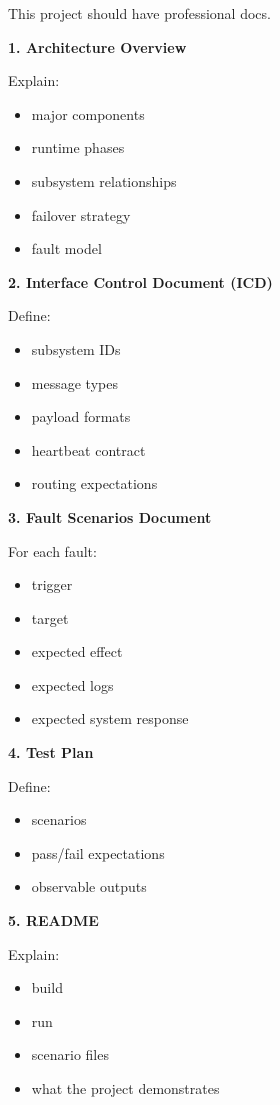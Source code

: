 \documentclass{report}
\begin{document}
This project should have professional docs.

\textbf{1. Architecture Overview}

Explain:
\begin{itemize}
   \item major components
   \item runtime phases
   \item subsystem relationships
   \item failover strategy
   \item fault model
\end{itemize}

\textbf{2. Interface Control Document (ICD)}

Define:
\begin{itemize}
   \item subsystem IDs
   \item message types
   \item payload formats
   \item heartbeat contract
   \item routing expectations
\end{itemize}

\textbf{3. Fault Scenarios Document}

For each fault:
\begin{itemize}
   \item trigger
   \item target
   \item expected effect
   \item expected logs
   \item expected system response
\end{itemize}

\textbf{4. Test Plan}

Define:
\begin{itemize}
   \item scenarios
   \item pass/fail expectations
   \item observable outputs
\end{itemize}

\textbf{5. README}

Explain:
\begin{itemize}
   \item build
   \item run
   \item scenario files
   \item what the project demonstrates
\end{itemize}
\end{document}
